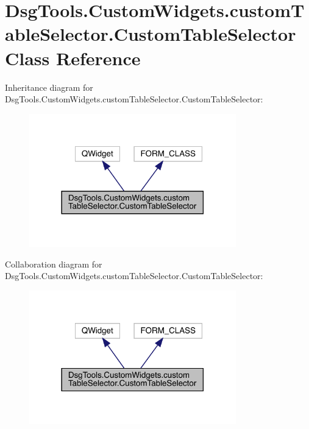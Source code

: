 \hypertarget{class_dsg_tools_1_1_custom_widgets_1_1custom_table_selector_1_1_custom_table_selector}{}\section{Dsg\+Tools.\+Custom\+Widgets.\+custom\+Table\+Selector.\+Custom\+Table\+Selector Class Reference}
\label{class_dsg_tools_1_1_custom_widgets_1_1custom_table_selector_1_1_custom_table_selector}


Inheritance diagram for Dsg\+Tools.\+Custom\+Widgets.\+custom\+Table\+Selector.\+Custom\+Table\+Selector\+:
\nopagebreak
\begin{figure}[H]
\begin{center}
\leavevmode
\includegraphics[width=254pt]{class_dsg_tools_1_1_custom_widgets_1_1custom_table_selector_1_1_custom_table_selector__inherit__graph}
\end{center}
\end{figure}


Collaboration diagram for Dsg\+Tools.\+Custom\+Widgets.\+custom\+Table\+Selector.\+Custom\+Table\+Selector\+:
\nopagebreak
\begin{figure}[H]
\begin{center}
\leavevmode
\includegraphics[width=254pt]{class_dsg_tools_1_1_custom_widgets_1_1custom_table_selector_1_1_custom_table_selector__coll__graph}
\end{center}
\end{figure}
